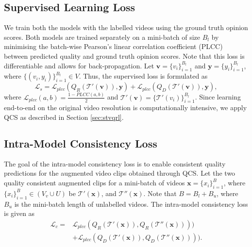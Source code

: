\documentclass[10pt,twocolumn,letterpaper]{article}
\begin{document}
\subsection{Supervised Learning Loss}
We train both the models with the labelled videos using the ground truth opinion scores. Both models are trained separately on a mini-batch of size $B_l$ by minimising the batch-wise Pearson's linear correlation coefficient (PLCC) between predicted quality and ground truth opinion scores. Note that this loss is differentiable and allows for back-propagation. Let $\mathbf{v} = \{v_i\}_{i=1}^{B_l}$ and $\mathbf{y} = \{y_i\}_{i=1}^{B_l}$, where $\{(v_i,y_i)\}_{i=1}^{B_l} \in V$. Thus, the supervised loss is formulated as
\begin{equation}
    \mathcal{L}_s = \mathcal{L}_{plcc}(Q_R(\mathcal{T}'(\mathbf{v})), \mathbf{y}) + \mathcal{L}_{plcc}(Q_D(\mathcal{T}'(\mathbf{v})), \mathbf{y}),
\label{mos_loss}
\end{equation}
where $\mathcal{L}_{plcc}(a,b) = \frac{1 - PLCC(a,b)}{2}$ and $\mathcal{T}'(\mathbf{v}) = \{\mathcal{T}'(v_i) \}_{i=1}^{B_l}$. Since learning end-to-end on the original video resolution is computationally intensive, we apply QCS as described in Section \ref{sec:stvqrl}.

\subsection{Intra-Model Consistency Loss}

The goal of the intra-model consistency loss is to enable consistent quality predictions for the augmented video clips obtained through QCS. Let the two quality consistent augmented clips for a mini-batch of videos $\mathbf{x} = \{ x_i \}_{i=1}^{B}$, where $\{ x_i \}_{i=1}^{B} \in (V_v \cup U)$ be $\mathcal{T}'(\mathbf{x})$, and $\mathcal{T}''(\mathbf{x})$. Note that $ B =B_l + B_u$, where $B_u$ is the mini-batch length of unlabelled videos. The intra-model consistency loss is given as
\begin{align}
    \mathcal{L}_c =& \mathcal{L}_{plcc}(Q_R(\mathcal{T}'(\mathbf{x})), Q_R(\mathcal{T}''(\mathbf{x})))) \nonumber\\
                  &+ \mathcal{L}_{plcc}(Q_D(\mathcal{T}'(\mathbf{x})), Q_D(\mathcal{T}''(\mathbf{x})))).
    \label{cons_loss}
\end{align}
\end{document}
